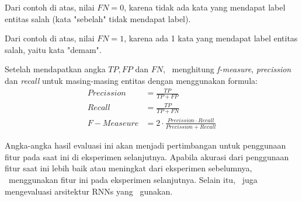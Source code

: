 \begin{enumerate}
	
		Dari contoh di atas, nilai $ FN = 0 $, karena tidak ada kata yang mendapat label entitas salah (kata "sebelah" tidak mendapat label).
		
	
		Dari contoh di atas, nilai $ FN = 1 $, karena ada 1 kata yang mendapat label entitas salah, yaitu kata "demam".
		
	\end{enumerate}
	
	Setelah mendapatkan angka $ TP, FP $ dan $ FN $, \saya~menghitung \textit{f-measure}, \textit{precission} dan \textit{recall} untuk masing-masing entitas dengan menggunakan formula:
	\begin{align}
		Precission &= \frac{TP}{TP+FP}\\
		Recall &= \frac{TP}{TP+FN}\\
		F-Measeure &= 2 \cdot \frac{Precission \cdot Recall}{Precission + Recall}
	\end{align}
	
	Angka-angka hasil evaluasi ini akan menjadi pertimbangan untuk penggunaan fitur pada saat ini di eksperimen selanjutnya. Apabila akurasi dari penggunaan fitur saat ini lebih baik atau meningkat dari eksperimen sebelumnya, \saya~menggunakan fitur ini pada eksperimen selanjutnya. Selain itu, \saya~juga mengevaluasi arsitektur RNNs yang \saya~gunakan.
	